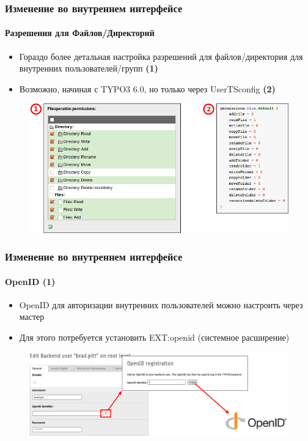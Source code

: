 
\begin{frame}[fragile]
	\frametitle{Изменение во внутреннем интерфейсе}
	\framesubtitle{Разрешения для Файлов/Директорий}

    \begin{itemize}
		\item Гораздо более детальная настройка разрешений для файлов/директория для внутренних пользователей/групп
			\begingroup\color{typo3red}\textbf{(1)}\endgroup
		\item Возможно, начиная с TYPO3 6.0, но только через UserTSconfig
			\begingroup\color{typo3red}\textbf{(2)}\endgroup
	\end{itemize}

	\begin{figure}
		\includegraphics[width=0.75\linewidth]{Images/BackendChanges/FileAndDirectoryPermissions.png}
	\end{figure}

\end{frame}


\begin{frame}[fragile]
	\frametitle{Изменение во внутреннем интерфейсе}
	\framesubtitle{OpenID (1)}

 	\begin{itemize}
		\item OpenID для авторизации внутренних пользователей можно настроить через мастер
		\item Для этого потребуется установить EXT:openid (системное расширение)
	\end{itemize}

	\begin{figure}
		\includegraphics[width=0.95\linewidth]{Images/BackendChanges/OpenIdWizard.png}
	\end{figure}

\end{frame}

